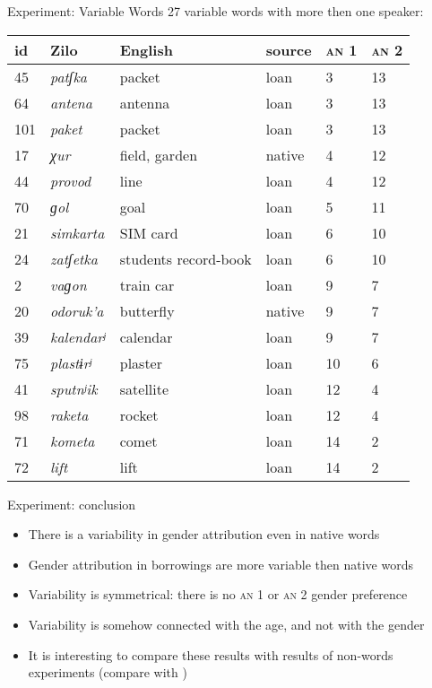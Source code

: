 \documentclass[13pt, t]{beamer}
\begin{document}
\begin{frame}{Experiment: Variable Words}
27 variable words with more then one speaker: \bigskip\\

\small
\begin{tabular}{|l|l|l|l|l|l|}
\hline
id & Zilo & English & source & \textsc{an} 1 & \textsc{an} 2 \\ \hline
45 & \textit{patʃka} & packet & loan & 3 & 13 \\ \hline
64 & \textit{antena} & antenna & loan & 3 & 13 \\ \hline
101 & \textit{paket} & packet & loan & 3 & 13 \\ \hline
17 & \textit{χur} & field, garden & native & 4 & 12 \\ \hline
44 & \textit{provod} & line & loan & 4 & 12 \\ \hline
70 & \textit{ɡol} & goal & loan & 5 & 11 \\ \hline
21 & \textit{simkarta} & SIM card& loan & 6 & 10 \\ \hline
24 & \textit{zatʃetka} & students record-book & loan & 6 & 10 \\ \hline
2 & \textit{vaɡon} & train car & loan & 9 & 7 \\ \hline
20 & \textit{odoruk'a} & butterfly & native & 9 & 7 \\ \hline
39 & \textit{kalendarʲ} & calendar & loan & 9 & 7 \\ \hline
75 & \textit{plastɨrʲ} & plaster & loan & 10 & 6 \\ \hline
41 & \textit{sputnʲik} & satellite & loan & 12 & 4 \\ \hline
98 & \textit{raketa} & rocket & loan & 12 & 4 \\ \hline
71 & \textit{kometa} & comet & loan & 14 & 2 \\ \hline
72 & \textit{lift} & lift & loan & 14 & 2 \\ \hline
\end{tabular}
\end{frame}


\begin{frame}{Experiment: conclusion}
\begin{itemize}
\item There is a variability in gender attribution even in native words
\item Gender attribution in borrowings are more variable then native words
\item Variability is symmetrical: there is no \textsc{an} 1 or \textsc{an} 2 gender preference
\item Variability is somehow connected with the age, and not with the gender \pause
\item It is interesting to compare these results with results of non-words experiments (compare with \citep{dabrowska05})
\end{itemize}
\end{frame}
\end{document}
